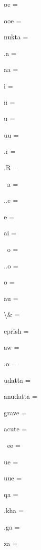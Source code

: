 \documentclass{article}
\begin{document}
\begin{multicols}{6}
\noindent oe = {\fdeva {}}\par
\noindent ooe = {\fdeva {}}\par
\noindent nukta = {\fdeva {}}\par
\noindent .a = {\fdeva {}}\par
\noindent aa = {\fdeva {}}\par
\noindent i = {\fdeva {}}\par
\noindent ii = {\fdeva {}}\par
\noindent u = {\fdeva {}}\par
\noindent uu = {\fdeva {}}\par
\noindent .r = {\fdeva {}}\par
\noindent .R = {\fdeva {}}\par
\noindent ~a = {\fdeva {}}\par
\noindent ..e = {\fdeva {}}\par
\noindent e = {\fdeva {}}\par
\noindent ai = {\fdeva {}}\par
\noindent ~o = {\fdeva {}}\par
\noindent ..o = {\fdeva {}}\par
\noindent o = {\fdeva {}}\par
\noindent au = {\fdeva {}}\par
\noindent \textbackslash\& = {\fdeva \vh{\&}}\par
\noindent eprish = {\fdeva {}}\par
\noindent aw = {\fdeva {}}\par
\noindent .o = {\fdeva {}}\par
\noindent udatta = {\fdeva {}}\par
\noindent anudatta = {\fdeva {}}\par
\noindent grave = {\fdeva {}}\par
\noindent acute = {\fdeva {}}\par
\noindent ~ee = {\fdeva {}}\par
\noindent ue = {\fdeva {}}\par
\noindent uue = {\fdeva {}}\par
\noindent qa = {\fdeva {}}\par
\noindent .kha = {\fdeva {}}\par
\noindent .ga = {\fdeva {}}\par
\noindent za = {\fdeva {}}\par

\end{multicols}
\end{document}
